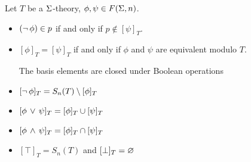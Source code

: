 \begin{prop}
    Let $T$ be a $\Sigma$-theory, $\phi, \psi \in F(\Sigma,n)$.
    \begin{itemize}
        \item $(\neg\, \phi) \in p$ if and only if $p \notin [\psi]_T$.
        \item $[\phi]_T = [\psi]_T$ if and only if $\phi$ and $\psi$ are 
            equivalent modulo $T$.

        The basis elements are closed under Boolean operations
        \item $[\neg\, \phi]_T = S_n(T) \setminus [\phi]_T$
        \item $[\phi \, \lor \, \psi]_T = [\phi]_T \cup [\psi]_T$
        \item $[\phi \, \land \, \psi]_T = [\phi]_T \cap [\psi]_T$
        \item $[\top]_T = S_n(T)$ and $[\bot]_T = \varnothing$
    \end{itemize}
\end{prop}
